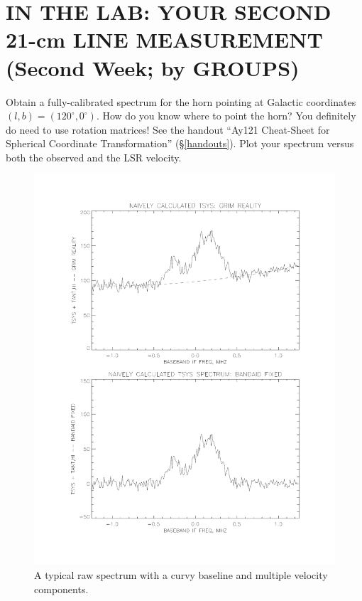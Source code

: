 \documentclass[12pt,preprint]{aastex}
\begin{document}
\section{IN THE LAB: YOUR SECOND 21-cm LINE MEASUREMENT (Second Week; by
  GROUPS)} 
\label{meas2}

Obtain a fully-calibrated spectrum for the horn pointing at Galactic
coordinates $(l,b)=(120^\circ, 0^\circ)$. How do you know where to point
the horn? You definitely do need to use rotation matrices!  See the
handout ``Ay121 Cheat-Sheet for Spherical Coordinate Transformation''
(\S \ref{handouts}). Plot your spectrum versus both the observed and
the LSR velocity. 

\begin{figure}[h!]
\begin{center}
%       
\includegraphics[scale=0.5]{bmp_cal1.pdf}
\end{center}
\vspace{-0.3in}
\caption{\footnotesize A typical raw spectrum with a curvy baseline and
  multiple velocity components. \label{rawspect}}
\end{figure}
\end{document}
